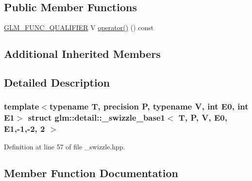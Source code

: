 \subsection*{Public Member Functions}
\begin{DoxyCompactItemize}
\item 
\hyperlink{setup_8hpp_a33fdea6f91c5f834105f7415e2a64407}{G\+L\+M\+\_\+\+F\+U\+N\+C\+\_\+\+Q\+U\+A\+L\+I\+F\+I\+ER} V \hyperlink{structglm_1_1detail_1_1__swizzle__base1_3_01_t_00_01_p_00_01_v_00_01_e0_00_01_e1_00-1_00-2_00_012_01_4_af48130c89b030e5739a743d2647fadcd}{operator()} () const
\end{DoxyCompactItemize}
\subsection*{Additional Inherited Members}


\subsection{Detailed Description}
\subsubsection*{template$<$typename T, precision P, typename V, int E0, int E1$>$\newline
struct glm\+::detail\+::\+\_\+swizzle\+\_\+base1$<$ T, P, V, E0, E1,-\/1,-\/2, 2 $>$}



Definition at line 57 of file \+\_\+swizzle.\+hpp.



\subsection{Member Function Documentation}
\mbox{\label{structglm_1_1detail_1_1__swizzle__base1_3_01_t_00_01_p_00_01_v_00_01_e0_00_01_e1_00-1_00-2_00_012_01_4_af48130c89b030e5739a743d2647fadcd}} 
